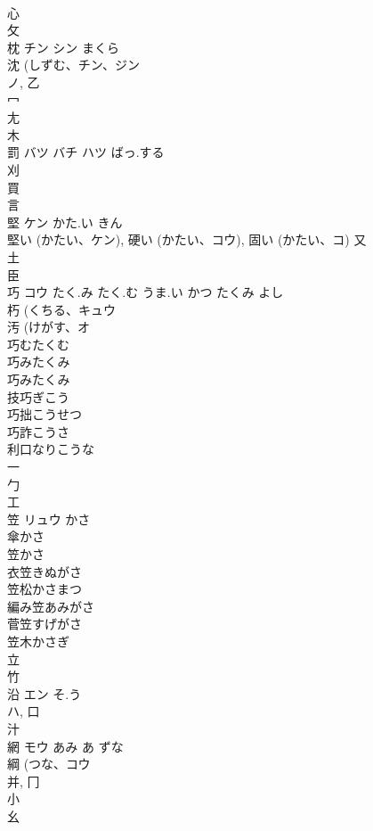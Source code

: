 \documentclass[8pt]{extreport}
\begin{document}
\begin{CJK}{UTF8}{min}
\\	心 
\\	攵 
\\	枕	チン シン	まくら	
\\	沈 (しずむ、チン、ジン 
\\	ノ, 乙 
\\	冖 
\\	尢 
\\	木 
\\	罰	バツ バチ ハツ	ばっ.する	
\\	刈 
\\	買 
\\	言 
\\	堅	ケン	かた.い きん	
\\	堅い (かたい、ケン), 硬い (かたい、コウ), 固い (かたい、コ)			又 
\\	土 
\\	臣 
\\	巧	コウ	たく.み たく.む うま.い かつ たくみ よし	
\\	朽 (くちる、キュウ 
\\	汚 (けがす、オ 
\\	巧むたくむ
\\	巧みたくみ
\\	巧みたくみ
\\	技巧ぎこう
\\	巧拙こうせつ
\\	巧詐こうさ
\\	利口なりこうな
\\	一 
\\	勹 
\\	工 
\\	笠	リュウ	かさ	
\\	傘かさ 
\\	笠かさ 
\\	衣笠きぬがさ 
\\	笠松かさまつ 
\\	編み笠あみがさ 
\\	菅笠すげがさ 
\\	笠木かさぎ 
\\	立 
\\	竹 
\\	沿	エン	そ.う	
\\	ハ, 口 
\\	汁 
\\	網	モウ	あみ あ ずな	
\\	綱 (つな、コウ 
\\	并, 冂 
\\	小 
\\	幺 

\end{CJK}
\end{document}
